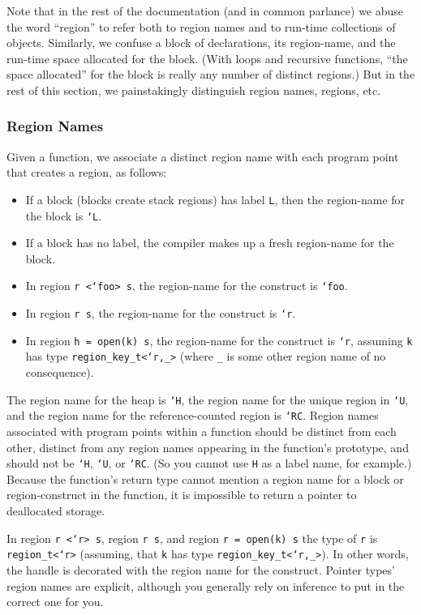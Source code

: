Note that in the rest of the documentation (and in common parlance) we
abuse the word ``region'' to refer both to region names and to
run-time collections of objects.  Similarly, we confuse a block of
declarations, its region-name, and the run-time space allocated for
the block.  (With loops and recursive functions, ``the space
allocated'' for the block is really any number of distinct regions.)
But in the rest of this section, we painstakingly distinguish
region names, regions, etc.

\subsubsection{Region Names}

Given a function, we associate a distinct region name with each
program point that creates a region, as follows:

\begin{itemize}
\item If a block (blocks create stack regions) has label \texttt{L},
  then the region-name for the block is \texttt{`L}.
\item If a block has no label, the compiler makes up a fresh
  region-name for the block.
\item In region \texttt{r <`foo> s}, the region-name for the construct
  is \texttt{`foo}.
\item In region \texttt{r s}, the region-name for the construct is
  \texttt{`r}.
\item In region \texttt{h = open(k) s}, the region-name for the construct is
  \texttt{`r}, assuming \texttt{k} has type \texttt{region\_key\_t<`r,_>}
  (where \texttt{_} is some other region name of no consequence).
\end{itemize}

The region name for the heap is \texttt{`H}, the region name for the unique
region in \texttt{`U}, and the region name for the reference-counted region
is \texttt{`RC}.  Region names associated with program points within a
function should be distinct from each other, distinct from any region names
appearing in the function's prototype, and should not be \texttt{`H},
\texttt{`U}, or \texttt{`RC}.  (So you cannot use \texttt{H} as a label
name, for example.)  Because the function's return type cannot mention a
region name for a block or region-construct in the function, it is
impossible to return a pointer to deallocated storage.

In region \texttt{r <`r> s}, region \texttt{r s}, and region \texttt{r =
open(k) s} the type of \texttt{r} is \texttt{region_t<`r>} (assuming, that
\texttt{k} has type \texttt{region\_key\_t<`r,_>}). In other words, the
handle is decorated with the region name for the construct.  Pointer types'
region names are explicit, although you generally rely on inference to put
in the correct one for you.

